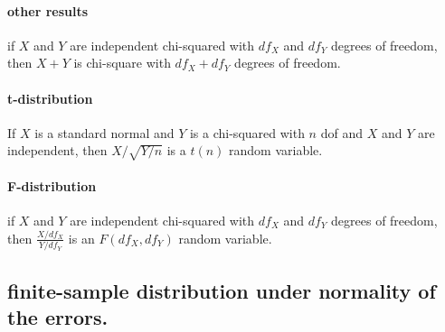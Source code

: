 \paragraph{other results}
if $X$ and $Y$ are independent chi-squared with $df_X$ and
         $df_Y$ degrees of freedom, then $X + Y$ is chi-square with
         $df_X + df_Y$ degrees of freedom.

\paragraph{t-distribution}
      If $X$ is a standard normal and $Y$ is a chi-squared with $n$ dof
      and $X$ and $Y$ are independent, then $X/\sqrt{Y/n}$ is a $t(n)$
      random variable.

\paragraph{F-distribution}
       if $X$ and $Y$ are independent chi-squared with $df_X$ and $df_Y$
       degrees of freedom, then $\frac{X/df_X}{Y/df_Y}$ is an $F(df_X,
       df_Y)$ random variable.

\subsection{finite-sample distribution under normality of the errors.}

